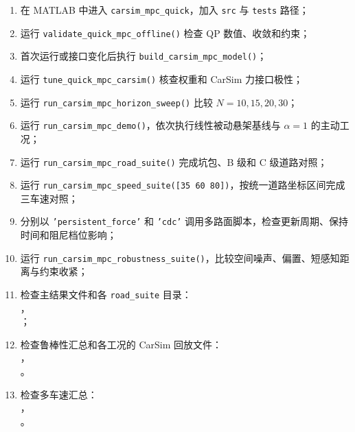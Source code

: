 \documentclass[UTF8,12pt,a4paper,fontset=windows]{ctexart}
\begin{document}
\begin{enumerate}
  \item 在 MATLAB 中进入 \texttt{carsim\_mpc\_quick}，加入 \texttt{src} 与 \texttt{tests} 路径；
  \item 运行 \texttt{validate\_quick\_mpc\_offline()} 检查 QP 数值、收敛和约束；
  \item 首次运行或接口变化后执行 \texttt{build\_carsim\_mpc\_model()}；
  \item 运行 \texttt{tune\_quick\_mpc\_carsim()} 核查权重和 CarSim 力接口极性；
  \item 运行 \texttt{run\_carsim\_mpc\_horizon\_sweep()} 比较 $N=10,15,20,30$；
  \item 运行 \texttt{run\_carsim\_mpc\_demo()}，依次执行线性被动悬架基线与 $\alpha=1$ 的主动工况；
  \item 运行 \texttt{run\_carsim\_mpc\_road\_suite()} 完成坑包、B 级和 C 级道路对照；
  \item 运行 \texttt{run\_carsim\_mpc\_speed\_suite([35 60 80])}，按统一道路坐标区间完成三车速对照；
  \item 分别以 \texttt{'persistent\_force'} 和 \texttt{'cdc'} 调用多路面脚本，检查更新周期、保持时间和阻尼档位影响；
  \item 运行 \texttt{run\_carsim\_mpc\_robustness\_suite()}，比较空间噪声、偏置、短感知距离与约束收紧；
  \item 检查主结果文件和各 \texttt{road\_suite} 目录：\\
    ，\\
    ；
  \item 检查鲁棒性汇总和各工况的 CarSim 回放文件：\\
    ，\\
    。
  \item 检查多车速汇总：\\
    ，\\
    。
\end{enumerate}
\end{document}

